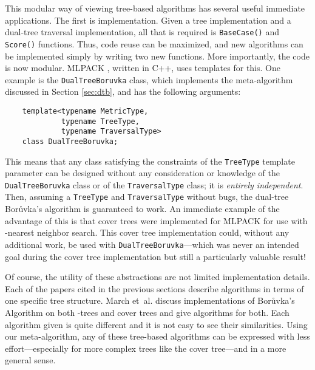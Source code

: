 \documentclass{article}
\begin{document}
This modular way of viewing tree-based algorithms has several useful immediate
applications.  The first is implementation.  Given a tree implementation and a
dual-tree traversal implementation, all that is required is \texttt{BaseCase()}
and \texttt{Score()} functions.  Thus, code reuse can be maximized, and new
algorithms can be implemented simply by writing two new functions.  More
importantly, the code is now modular.  MLPACK \cite{curtin2011}, written in C++,
uses templates for this.  One example is the \texttt{DualTreeBoruvka} class,
which implements the meta-algorithm discussed in Section \ref{sec:dtb}, and has
the following arguments:

\vspace*{-0.7em}
\begin{verbatim}
    template<typename MetricType,
             typename TreeType,
             typename TraversalType>
    class DualTreeBoruvka;
\end{verbatim}
\vspace*{-0.6em}

This means that any class satisfying the constraints of the \texttt{TreeType}
template parameter can be designed without any consideration or knowledge of the
\texttt{DualTreeBoruvka} class or of the \texttt{TraversalType} class; it is
\textit{entirely independent}.  Then, assuming a \texttt{TreeType} and
\texttt{TraversalType} without bugs, the dual-tree Bor\r{u}vka's algorithm is
guaranteed to work.  An immediate example of the advantage of this is that cover
trees were implemented for MLPACK for use with -nearest neighbor search.
This cover tree implementation could, without any additional work, be used with
\texttt{DualTreeBoruvka}---which was never an intended goal during the cover
tree implementation but still a particularly valuable result!






\vspace*{-0.2em}
Of course, the utility of these abstractions are not limited implementation
details.  Each of the papers cited in the previous sections describe algorithms
in terms of one specific tree structure.  March et~al.  
discuss implementations of Bor\r{u}vka's Algorithm on both -trees and cover
trees and give algorithms for both.  Each algorithm given is quite different and
it is not easy to see their similarities.  Using our meta-algorithm, any of
these tree-based algorithms can be expressed with less effort---especially for
more complex trees like the cover tree---and in a more general sense.
\end{document}
